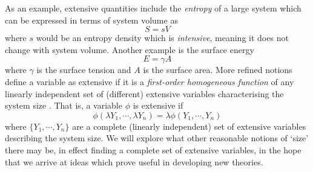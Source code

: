As an example, extensive quantities include the \emph{entropy} of a large system which can be expressed in terms of system volume as
\begin{equation*}
  S = s V
\end{equation*}
where $s$ would be an entropy density which is \emph{intensive}, meaning it does not change with system volume.
Another example is the surface energy
\begin{equation*}
  E = \gamma A
\end{equation*}
where $\gamma$ is the surface tension and $A$ is the surface area.
More refined notions define a variable as extensive if it is a \emph{first-order homogeneous function} of any linearly independent set of (different) extensive variables characterising the system size \cite{Chandler1987}.
That is, a variable $\phi$ is extensive if
\begin{equation}\label{eq:extensive-homogeneity}
  \phi(\lambda Y_1, \cdots, \lambda Y_n)
  =
  \lambda \phi(Y_1, \cdots, Y_n)
\end{equation}
where $\{Y_1, \cdots, Y_n\}$ are a complete (linearly independent) set of extensive variables describing the system size.
We will explore what other reasonable notions of `size' there may be, in effect finding a complete set of extensive variables, in the hope that we arrive at ideas which prove useful in developing new theories.

